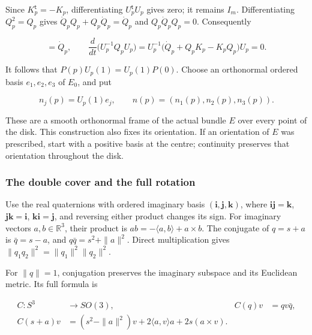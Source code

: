 Since \(K_p^{\mathsf t}=-K_p\), differentiating \(U_p^{\mathsf t}U_p\) gives zero; it remains \(I_m\). Differentiating \(Q_p^2=Q_p\) gives
\(\dot Q_pQ_p+Q_p\dot Q_p=\dot Q_p\) and \(Q_p\dot Q_pQ_p=0\). Consequently

\begin{equation}
[K_p,Q_p]=\dot Q_p,\qquad
\frac{d}{dt}\bigl(U_p^{-1}Q_pU_p\bigr)
 =U_p^{-1}\bigl(\dot Q_p+Q_pK_p-K_pQ_p\bigr)U_p=0.
\label{courseIII:belt-sphere-complements-and-the-whitney-disk:eq:6.4}
\end{equation}

It follows that \(P(p)U_p(1)=U_p(1)P(0)\). Choose an orthonormal ordered basis \(e_1,e_2,e_3\) of \(E_0\), and put

\begin{equation}
n_j(p)=U_p(1)e_j,\qquad
n(p)=(n_1(p),n_2(p),n_3(p)).
\label{courseIII:belt-sphere-complements-and-the-whitney-disk:eq:6.5}
\end{equation}

These are a smooth orthonormal frame of the actual bundle \(E\) over every point of the disk. This construction also fixes its orientation. If an orientation of \(E\) was prescribed, start with a positive basis at the centre; continuity preserves that orientation throughout the disk.

\subsubsection{The double cover and the full rotation}
\label{courseIII:belt-sphere-complements-and-the-whitney-disk:section-6.2}

Use the real quaternions with ordered imaginary basis
\((\mathbf i,\mathbf j,\mathbf k)\), where
\(\mathbf i\mathbf j=\mathbf k\),
\(\mathbf j\mathbf k=\mathbf i\),
\(\mathbf k\mathbf i=\mathbf j\), and reversing either product changes its sign. For imaginary vectors \(a,b\in\mathbb R^3\), their product is
\(ab=-\langle a,b\rangle+a\times b\).
The conjugate of \(q=s+a\) is \(\bar q=s-a\), and \(q\bar q=s^2+\|a\|^2\). Direct multiplication gives
\(\|q_1q_2\|^2=\|q_1\|^2\|q_2\|^2\).

For \(\|q\|=1\), conjugation preserves the imaginary subspace and its Euclidean metric. Its full formula is

\begin{equation}
\begin{aligned}
C:S^3&\longrightarrow SO(3),&
C(q)v&=qv\bar q,\\
C(s+a)v
 &=(s^2-\|a\|^2)v
   +2\langle a,v\rangle a+2s(a\times v).
\end{aligned}
\label{courseIII:belt-sphere-complements-and-the-whitney-disk:eq:6.6}
\end{equation}

